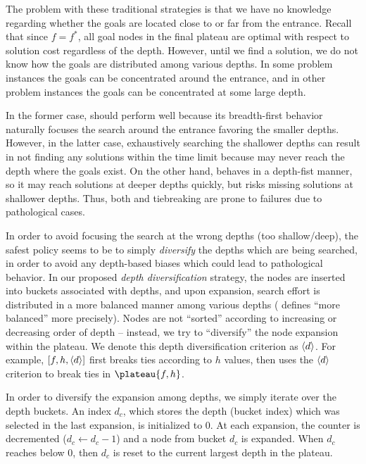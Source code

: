 The problem with these traditional strategies is that we have no knowledge
regarding whether the goals are located close to or far from the entrance. Recall
that since $f=f^*$, all goal nodes in the final plateau are optimal with respect to solution cost
regardless of the depth.
However, until we find a
solution, we do not know how the goals are distributed among various
depths. In some problem instances the goals can be concentrated around
the entrance, and in other problem instances the goals can be
concentrated at some large depth. %

In the former case, \fifo
should perform well because its breadth-first behavior naturally
focuses the search around the entrance favoring the smaller depths.
However, in the latter case, exhaustively searching
the shallower depths can result in not finding any solutions within
the time limit because \fifo may never reach the depth where the goals
exist.  On the other hand, \lifo behaves in a depth-fist manner, so it
may reach solutions at deeper depths quickly, but risks missing
solutions at shallower depths.  Thus, both \fifo and \lifo tiebreaking
are prone to failures due to pathological cases.

In order to avoid focusing the search at the wrong depths (too shallow/deep), 
the safest policy seems to be to simply \emph{diversify} the depths which are being searched,
in order to avoid any depth-based biases which could lead to pathological behavior.
In our proposed \emph{depth diversification} strategy, the nodes are inserted into buckets
associated with depths, and upon expansion, search effort is distributed in a more balanced manner
among various depths ( defines ``more balanced''  more precisely).
Nodes are not  ``sorted''
according to increasing or decreasing order of depth -- instead, we try to 
``diversify'' the node expansion within the plateau.
We denote this depth diversification criterion as ${\left<d\right>}$. 
For example, $[f,h,{\left<d\right>}]$ first breaks ties according to $h$ values,
then uses the ${\left<d\right>}$ criterion to break ties in $\plateau{f,h}$.

In order to diversify the expansion among depths, we simply
iterate over the depth buckets. An index $d_c$,
 which stores the depth (bucket index)  which was selected in the last expansion,
is initialized to 0.
At each expansion, the counter is decremented ($d_c\leftarrow d_c-1$) and
a node from  bucket $d_c$ is expanded. When $d_c$ reaches below 0, then $d_c$
is reset to the current largest depth in the plateau.

